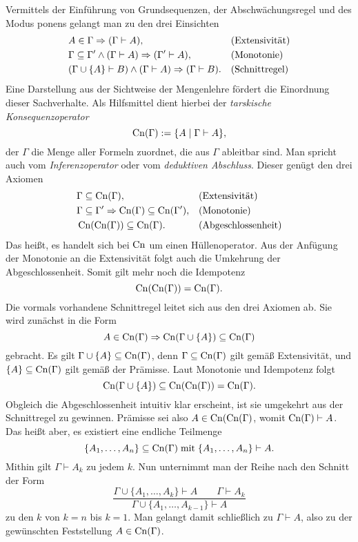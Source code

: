 Vermittels der Einführung von Grundsequenzen, der Abschwächungsregel
und des Modus ponens gelangt man zu den drei Einsichten%
\begin{align*}
&A\in\Gamma\Rightarrow (\Gamma\vdash A), &&\text{(Extensivität)}\\
&\Gamma\subseteq\Gamma'\land (\Gamma\vdash A)\Rightarrow (\Gamma'\vdash A), &&\text{(Monotonie)}\\
&(\Gamma\cup\{A\}\vdash B)\land (\Gamma\vdash A)\Rightarrow (\Gamma\vdash B). &&\text{(Schnittregel)}
\end{align*}
Eine Darstellung aus der Sichtweise der Mengenlehre fördert die Einordnung
dieser Sachverhalte. Als Hilfsmittel dient hierbei der
\emph{tarskische Konsequenzoperator}%
\[\operatorname{Cn}(\Gamma) := \{A\mid \Gamma\vdash A\},\]
der $\Gamma$ die Menge aller Formeln zuordnet,
die aus $\Gamma$ ableitbar sind. Man spricht auch vom
\emph{Inferenzoperator} oder vom \emph{deduktiven Abschluss}.
Dieser genügt den drei Axiomen
\begin{align*}
&\Gamma\subseteq\operatorname{Cn}(\Gamma), &&\text{(Extensivität)}\\
&\Gamma\subseteq\Gamma'\Rightarrow \operatorname{Cn}(\Gamma)\subseteq\operatorname{Cn}(\Gamma'), &&\text{(Monotonie)}\\
&\operatorname{Cn}(\operatorname{Cn}(\Gamma)) \subseteq \operatorname{Cn}(\Gamma). &&\text{(Abgeschlossenheit)}
\end{align*}
Das heißt, es handelt sich bei $\operatorname{Cn}$ um einen Hüllenoperator. Aus der
Anfügung der Monotonie an die Extensivität folgt auch die Umkehrung
der Abgeschlossenheit. Somit gilt mehr noch die Idempotenz
\[\operatorname{Cn}(\operatorname{Cn}(\Gamma)) = \operatorname{Cn}(\Gamma).\]
Die vormals
vorhandene Schnittregel leitet sich aus den drei Axiomen ab.
Sie wird zunächst in die Form%
\[A\in\operatorname{Cn}(\Gamma)\Rightarrow\operatorname{Cn}(\Gamma\cup\{A\})\subseteq\operatorname{Cn}(\Gamma)\]
gebracht. Es gilt $\Gamma\cup\{A\}\subseteq\operatorname{Cn}(\Gamma)$, denn
$\Gamma\subseteq\operatorname{Cn}(\Gamma)$ gilt gemäß Extensivität, und
$\{A\}\subseteq\operatorname{Cn}(\Gamma)$ gilt gemäß der Prämisse.
Laut Monotonie und Idempotenz folgt%
\[\operatorname{Cn}(\Gamma\cup\{A\})\subseteq\operatorname{Cn}(\operatorname{Cn}(\Gamma)) = \operatorname{Cn}(\Gamma).\]
Obgleich die Abgeschlossenheit intuitiv klar erscheint, ist sie
umgekehrt aus der Schnittregel zu gewinnen. Prämisse sei also
$A\in\operatorname{Cn}(\operatorname{Cn}(\Gamma)$, womit $\operatorname{Cn}(\Gamma)\vdash A$. Das heißt aber,
es existiert eine endliche Teilmenge
\[\{A_1,\ldots,A_n\}\subseteq\operatorname{Cn}(\Gamma)\;\text{mit}\;
\{A_1,\ldots,A_n\}\vdash A.\]
Mithin gilt $\Gamma\vdash A_k$ zu jedem $k$.
Nun unternimmt man der Reihe nach den Schnitt der Form
\[\dfrac{\Gamma\cup\{A_1,\ldots,A_k\}\vdash A\qquad\Gamma\vdash A_k}
{\Gamma\cup\{A_1,\ldots,A_{k-1}\}\vdash A}\]
zu den $k$ von $k=n$ bis $k=1$. Man gelangt damit schließlich zu
$\Gamma\vdash A$, also zu der gewünschten Feststellung $A\in\operatorname{Cn}(\Gamma)$.

